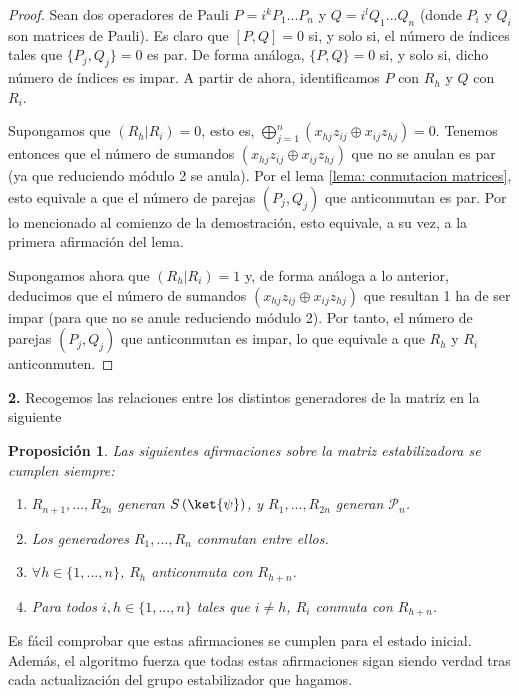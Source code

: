 \documentclass[11pt,a4paper,twoside,pdf]{article}
\numberwithin{equation}{section}
\newtheorem{proposition}{Proposición}
\begin{document}
		\begin{proof}
			Sean dos operadores de Pauli $P=i^kP_1...P_n$ y $Q=i^lQ_1...Q_n$ (donde $P_i$ y $Q_i$ son matrices de Pauli). Es claro que $[P,Q]=0$ si, y solo si, el número de índices tales que $\{P_j,Q_j\}=0$ es par. De forma análoga, $\{P,Q\}=0$ si, y solo si, dicho número de índices es impar. A partir de ahora, identificamos $P$ con $R_h$ y $Q$ con $R_i$.
				
			Supongamos que $(R_h|R_i)=0$, esto es, $\bigoplus_{j=1}^n (x_{hj}z_{ij} \oplus x_{ij}z_{hj})=0$. Tenemos entonces que el número de sumandos $(x_{hj}z_{ij} \oplus x_{ij}z_{hj})$ que no se anulan es par (ya que reduciendo módulo 2 se anula). Por el lema \ref{lema: conmutacion matrices}, esto equivale a que el número de parejas $\left( P_j,Q_j \right)$ que anticonmutan es par. Por lo mencionado al comienzo de la demostración, esto equivale, a su vez, a la primera afirmación del lema.
				
			Supongamos ahora que $(R_h|R_i)=1$ y, de forma análoga a lo anterior, deducimos que el número de sumandos $(x_{hj}z_{ij} \oplus x_{ij}z_{hj})$ que resultan 1 ha de ser impar (para que no se anule reduciendo módulo 2). Por tanto, el número de parejas $\left( P_j,Q_j \right)$ que anticonmutan es impar, lo que equivale a que $R_h$ y $R_i$ anticonmuten.
		\end{proof}
		
	\noindent \textbf{2. } Recogemos las relaciones entre los distintos generadores de la matriz en la siguiente
			
		\begin{proposition}\label{prop: proposicion Aaronson}
			Las siguientes afirmaciones sobre la matriz estabilizadora se cumplen siempre:
			\begin{enumerate}[label=(\roman*),itemsep=1pt]
				\item $R_{n+1},...,R_{2n}$ generan $S\left( \ket{\psi} \right)$, y $R_1,...,R_{2n}$ generan $\mathcal{P}_n$.
				\item \label{prop: Aaronson II}Los generadores $R_1,...,R_n$ conmutan entre ellos.
				\item \label{prop: Aaronson III}  $\forall h \in \{1,...,n\}$, $R_h$ anticonmuta con $R_{h+n}$.
				\item \label{prop: Aaronson IV}Para todos $ i,h \in \{1,...,n\}$ tales que $i\ne h$, $R_i$ conmuta con $R_{h+n}$.
			\end{enumerate}	
		\end{proposition}
	
	Es fácil comprobar que estas afirmaciones se cumplen para el estado inicial. Además, el algoritmo fuerza que todas estas afirmaciones sigan siendo verdad  tras cada actualización del grupo estabilizador que hagamos.
		
\end{document}
